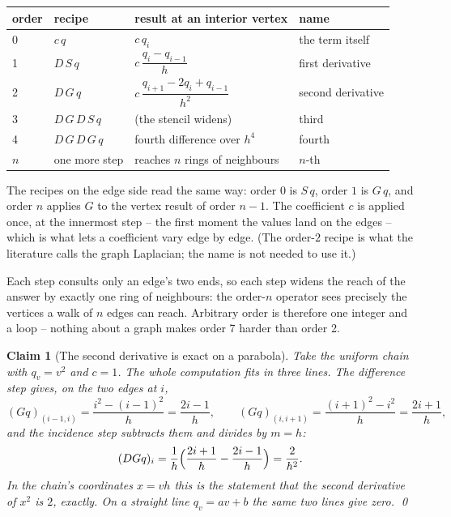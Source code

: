 \documentclass[11pt]{article}
\newtheorem{claim}{Claim}
\begin{document}
\begin{center}
\end{center}

\medskip
\begin{center}
\begin{tabular}{@{}llll@{}}
\toprule
order & recipe & result at an interior vertex & name \\
\midrule
0 & $c\,q$              & $c\,q_i$ & the term itself \\
1 & $D\,S\,q$           & $c\,\dfrac{q_i - q_{i-1}}{h}$ & first derivative \\[6pt]
2 & $D\,G\,q$           & $c\,\dfrac{q_{i+1} - 2q_i + q_{i-1}}{h^2}$ & second derivative \\[6pt]
3 & $D\,G\,D\,S\,q$     & (the stencil widens) & third \\
4 & $D\,G\,D\,G\,q$     & fourth difference over $h^4$ & fourth \\
$n$ & one more step     & reaches $n$ rings of neighbours & $n$-th \\
\bottomrule
\end{tabular}
\end{center}
\medskip

The recipes on the edge side read the same way: order $0$ is $S\,q$,
order $1$ is $G\,q$, and order $n$ applies $G$ to the vertex result
of order $n-1$. The coefficient $c$ is applied once, at the innermost step -- the
first moment the values land on the edges -- which is what lets a
coefficient vary edge by edge. (The order-$2$ recipe is what the literature calls the graph
Laplacian; the name is not needed to use it.)

Each step consults only an edge's two ends, so each step widens the
reach of the answer by exactly one ring of neighbours: the order-$n$
operator sees precisely the vertices a walk of $n$ edges can reach.
Arbitrary order is therefore one integer and a loop -- nothing about
a graph makes order 7 harder than order 2.

\begin{claim}[The second derivative is exact on a parabola]
Take the uniform chain with $q_v = v^2$ and $c = 1$. The whole
computation fits in three lines. The difference step gives, on the
two edges at $i$,
\[
(Gq)_{(i-1,i)} = \frac{i^2 - (i-1)^2}{h} = \frac{2i-1}{h},
\qquad
(Gq)_{(i,i+1)} = \frac{(i+1)^2 - i^2}{h} = \frac{2i+1}{h},
\]
and the incidence step subtracts them and divides by $m=h$:
\[
(DGq)_i = \frac{1}{h}\Bigl(\frac{2i+1}{h} - \frac{2i-1}{h}\Bigr)
        = \frac{2}{h^2}.
\]
In the chain's coordinates $x = vh$ this is the statement that the
second derivative of $x^2$ is $2$, exactly. On a straight line $q_v = av + b$ the
same two lines give zero. \qed
\end{claim}
\end{document}
